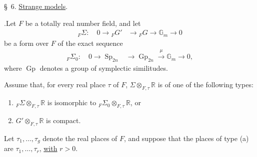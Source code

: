 \documentclass[10pt]{article}
\newcommand{\Gm}{\mathbb G_m}
\newcommand{\R}{\mathbb R}
\newcommand{\Gp}{\operatorname{Gp}}
\newcommand{\Sp}{\operatorname{Sp}}
\begin{document}
\noindent \S\ 6. \uline{Strange models}.\par\vspace{0.9em}

.\quad Let $F$ be a totally real number field, and let
\begingroup
\makeatletter
\tagsleft@true
\makeatother
\begin{align}
{}_F\Sigma:\quad 0\longrightarrow {}_FG'&\longrightarrow {}_FG
 \longrightarrow \Gm\longrightarrow0 \tag{6.1.1}
\end{align}
\endgroup
be a form over $F$ of the exact sequence
\begingroup
\makeatletter
\tagsleft@true
\makeatother
\begin{align}
{}_F\Sigma_0:\quad 0\longrightarrow\Sp_{2n}&\longrightarrow\Gp_{2n}
 \xrightarrow{\ \mu\ }\Gm\longrightarrow0, \tag{6.1.2}
\end{align}
\endgroup
where $\Gp$ denotes a group of symplectic similitudes.

Assume that, for every real place $\tau$ of $F$, $\Sigma\otimes_{F,\tau}\R$ is of one of the following types:
\begin{enumerate}[label=(\alph*)]
\item ${}_F\Sigma\otimes_{F,\tau}\R$ is isomorphic to ${}_F\Sigma_0\otimes_{F,\tau}\R$, or
\item $G'\otimes_{F,\tau}\R$ is compact.
\end{enumerate}
Let $\tau_1,\ldots,\tau_g$ denote the real places of $F$, and suppose that the places of type (a) are $\tau_1,\ldots,\tau_r$, \uline{with} $r>0$.
\end{document}
